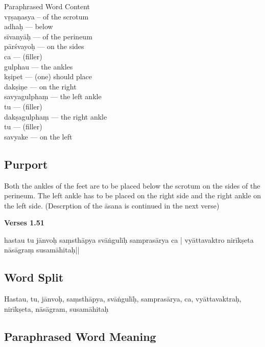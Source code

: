 \begin{multicols}{2}
Paraphrased Word Content \\
vṛṣaṇasya -- of the scrotum  \\ 
adhaḥ ---  below  \\
sīvanyāḥ ---  of the perineum  \\
pārśvayoḥ ---  on the sides  \\
ca ---  (filler) \\
gulphau ---  the ankles  \\
kṣipet ---   (one) should place  \\
dakṣiṇe --- on the right  \\
savyagulphaṃ --- the left ankle  \\
tu ---  (filler) \\
dakṣagulphaṃ ---  the right ankle  \\
tu ---  (filler) \\
savyake --- on the left 
\end{multicols}

\subsection*{Purport}


Both the ankles of the feet are to be placed below the scrotum on the sides of the perineum. The left ankle has to be placed on the right side and the right ankle on the left side. (Descrption of the āsana is continued in the next verse)

\newpage
\noindent \textbf{Verses 1.51}

\begin{center}
hastau tu jānvoḥ saṃsthāpya svāṅgulīḥ samprasārya ca |
vyāttavaktro nirīkṣeta nāsāgraṃ susamāhitaḥ||
\end{center}

\subsection*{Word Split}

Hastau, tu, jānvoḥ, saṃsthāpya, svāṅgulīḥ, samprasārya, ca, vyāttavaktraḥ, nirīkṣeta, nāsāgram, susamāhitaḥ

\subsection*{Paraphrased Word Meaning}

